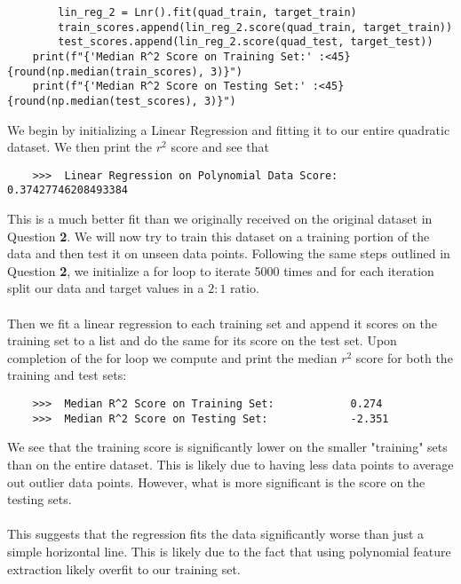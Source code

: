 \documentclass[12pt, letterpaper]{article}
\begin{document}
\begin{enumerate}
\begin{lstlisting}
        lin_reg_2 = Lnr().fit(quad_train, target_train)
        train_scores.append(lin_reg_2.score(quad_train, target_train))
        test_scores.append(lin_reg_2.score(quad_test, target_test))
    print(f"{'Median R^2 Score on Training Set:' :<45}{round(np.median(train_scores), 3)}")
    print(f"{'Median R^2 Score on Testing Set:' :<45}{round(np.median(test_scores), 3)}")
\end{lstlisting}
    We begin by initializing a Linear Regression and fitting it to our entire quadratic dataset. We 
    then print the $r^2$ score and see that 
\begin{lstlisting}
    >>>  Linear Regression on Polynomial Data Score:  0.37427746208493384
\end{lstlisting}
    This is a much better fit than we originally received on the original dataset in Question {\bf 2}. 
    We will now try to train this dataset on a training portion of the data and then test it on unseen 
    data points. Following the same steps outlined in Question {\bf 2}, we initialize a for loop to
    iterate 5000 times and for each iteration split our data and target values in a $2:1$ ratio. \\ \\
    Then we fit a linear regression to each training set and append it scores on the training set to 
    a list and do the same for its score on the test set. Upon completion of the for loop we compute and 
    print the median $r^2$ score for both the training and test sets:
\begin{lstlisting}
    >>>  Median R^2 Score on Training Set:            0.274
    >>>  Median R^2 Score on Testing Set:             -2.351
\end{lstlisting}
    We see that the training score is significantly lower on the smaller "training" sets than on the entire 
    dataset. This is likely due to having less data points to average out outlier data points. However, what 
    is more significant is the score on the testing sets. \\ \\
    This suggests that the regression fits the data significantly worse than just a simple 
    horizontal line. This is likely due to the fact that using polynomial feature extraction 
    likely overfit to our training set. 
\end{enumerate}
\end{document}
